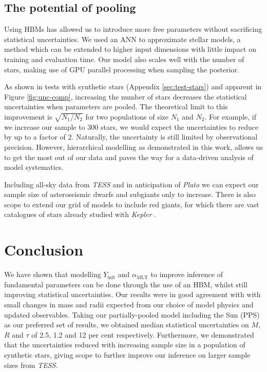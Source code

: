\documentclass[a4paper,fleqn,usenatbib]{mnras}
\newcommand{\mlt}{\ensuremath{{\alpha_\mathrm{MLT}}}}
\begin{document}
\subsection{The potential of pooling}\label{sec:future}

Using HBMs has allowed us to introduce more free parameters without sacrificing statistical uncertainties. We used an ANN to approximate stellar models, a method which can be extended to higher input dimensions with little impact on training and evaluation time. Our model also scales well with the number of stars, making use of GPU parallel processing when sampling the posterior.

As shown in tests with synthetic stars (Appendix \ref{sec:test-stars}) and apparent in Figure \ref{fig:unc-comp}, increasing the number of stars decreases the statistical uncertainties when parameters are pooled. The theoretical limit to this improvement is $\sqrt{N_1 / N_2}$ for two populations of size $N_1$ and $N_2$. For example, if we increase our sample to 300 stars, we would expect the uncertainties to reduce by up to a factor of 2. Naturally, the uncertainty is still limited by observational precision. However, hierarchical modelling as demonstrated in this work, allows us to get the most out of our data and paves the way for a data-driven analysis of model systematics.

Including all-sky data from \emph{TESS} and in anticipation of \emph{Plato} \citep{Rauer.Catala.ea2014} we can expect our sample size of asteroseismic dwarfs and subgiants only to increase. There is also scope to extend our grid of models to include red giants, for which there are vast catalogues of stars already studied with \emph{Kepler} \citep{Pinsonneault.Elsworth.ea2018}.

\section{Conclusion}

We have shown that modelling $Y_\mathrm{init}$ and $\mlt$ to improve inference of fundamental parameters can be done through the use of an HBM, whilst still improving statistical uncertainties. Our results were in good agreement with  with small changes in mass and radii expected from our choice of model physics and updated observables. Taking our partially-pooled model including the Sun (PPS) as our preferred set of results, we obtained median statistical uncertainties on $M$, $R$ and $\tau$ of 2.5, 1.2 and 12 per cent respectively. Furthermore, we demonstrated that the uncertainties reduced with increasing sample size in a population of synthetic stars, giving scope to further improve our inference on larger sample sizes from \emph{TESS}.
\end{document}

